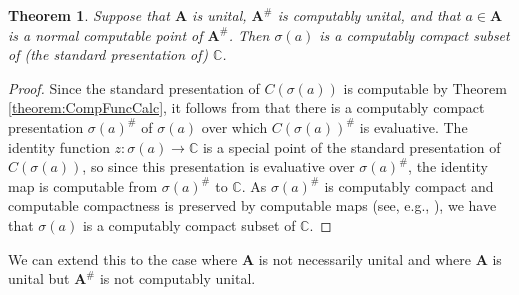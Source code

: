 \documentclass{amsart}
\newcommand{\boldA}{\mathbf{A}}
\theoremstyle{plain}
\newtheorem{theorem}{Theorem}[section]
\theoremstyle{definition}
\numberwithin{equation}{section}
\begin{document}
\begin{theorem}\label{theorem:ComputableCompactSpectrum}
Suppose that $\boldA$ is unital, $\boldA^\#$ is computably unital, and that $a \in \boldA$ is a normal computable point of $\boldA^\#$.  Then $\sigma(a)$ is a computably compact subset of (the standard presentation of) $\mathbb{C}$.
\end{theorem}
\begin{proof}
Since the standard presentation of $C(\sigma(a))$ is computable by Theorem \ref{theorem:CompFuncCalc}, it follows from \cite[Theorem 1.1 and 1.2]{McNicholl.2025} that there is a computably compact presentation $\sigma(a)^\#$ of $\sigma(a)$ over which $C(\sigma(a))^\#$ is evaluative.  The identity function $z : \sigma(a) \to \mathbb{C}$ is a special point of the standard presentation of $C(\sigma(a))$, so since this presentation is evaluative over $\sigma(a)^\#$, the identity map is computable from $\sigma(a)^\#$ to $\mathbb{C}$.  As $\sigma(a)^\#$ is computably compact and computable compactness is preserved by computable maps (see, e.g., \cite[Lemma 3.31]{DowneyMelnikov}), we have that $\sigma(a)$ is a computably compact subset of $\mathbb{C}$.
\end{proof}

We can extend this to the case where $\boldA$ is not necessarily unital and where $\boldA$ is unital but $\boldA^\#$ is not computably unital.
\end{document}
